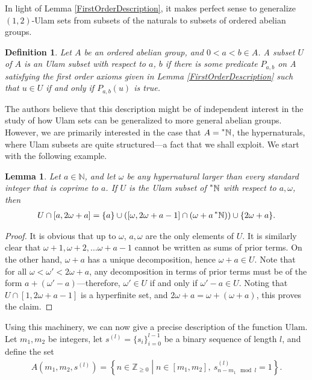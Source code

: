 \documentclass{amsart}
\newcommand{\NN}{\mathbb{N}}
\newcommand{\ZZ}{\mathbb{Z}}
\newcommand{\HN}{\prescript{*}{}{\NN}}
\theoremstyle{theorem}
\newtheorem{definition}{Definition}[section]
\newtheorem{lemma}{Lemma}[section]
\theoremstyle{definition}
\begin{document}
In light of Lemma \ref{FirstOrderDescription}, it makes perfect sense to generalize $(1, 2)$-Ulam sets from subsets of the naturals to subsets of ordered abelian groups.

\begin{definition}
Let $A$ be an ordered abelian group, and $0 < a < b \in A$. A subset $U$ of $A$ is an \emph{Ulam subset
with respect to} $a$, $b$ if there is some predicate $P_{a,b}$ on A satisfying the first order axioms given in Lemma \ref{FirstOrderDescription} such that $u \in U$ if and only if $P_{a,b}(u)$ is true.
\end{definition}
	
The authors believe that this description might be of independent interest in the study of how Ulam sets can be generalized to more general abelian groups. However, we are primarily interested in the case that $A = \HN$, the hypernaturals, where Ulam subsets are quite structured---a fact that we shall exploit. We start with the following example.

\begin{lemma}\label{Initial Segment}
Let $a \in \NN$, and let $\omega$ be any hypernatural larger than every standard integer that is coprime to $a$. If $U$ is the Ulam subset of $\HN$ with respect to $a,\omega$, then
	\begin{align*}
	U \cap [a,2\omega + a] = \{a\} \cup \left([\omega,2\omega + a - 1] \cap \left(\omega + a\HN\right)\right) \cup \{2\omega + a\}.
	\end{align*}
\end{lemma}
	
\begin{proof}
It is obvious that up to $\omega$, $a,\omega$ are the only elements of $U$. It is similarly clear that $\omega + 1, \omega + 2, \ldots \omega + a - 1$ cannot be written as sums of prior terms. On the other hand, $\omega + a$ has a unique decomposition, hence $\omega + a \in U$. Note that for all $\omega < \omega' < 2\omega + a$, any decomposition in terms of prior terms must be of the form $a + (\omega' - a)$---therefore, $\omega' \in U$ if and only if $\omega' - a \in U$. Noting that $U \cap [1,2\omega + a - 1]$ is a hyperfinite set, and $2\omega + a = \omega + (\omega + a)$, this proves the claim.
\end{proof}
	
Using this machinery, we can now give a precise description of the function $\text{Ulam}$. Let $m_1, m_2$ be integers, let $s^{(l)} = \{s_i\}_{i = 0}^{l - 1}$ be a binary sequence of length $l$, and define the set
	\begin{align*}
	A\left(m_1, m_2, s^{(l)}\right) = \left\{n \in \ZZ_{\geq 0} \middle| n \in [m_1,m_2], \ s^{(l)}_{n - m_1 \mod l} = 1\right\}.
	\end{align*}
\end{document}

